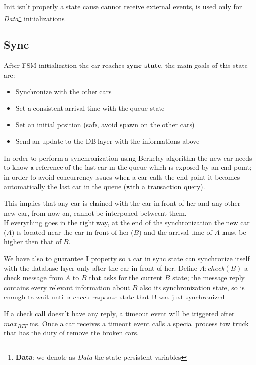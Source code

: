 Init isn't properly a state cause cannot receive external events, 
is used only for 
\textit{Data}\footnote{\textbf{Data}: we denote as \textit{Data} 
the state persistent variables} 
initializations.


\subsection{Sync}

After FSM initialization the car reaches \textbf{sync state}, the main goals 
of this state are:

\begin{itemize}
    \item Synchronize with the other cars
    \item Set a consistent arrival time with the queue state 
    \item Set an initial position (safe, avoid spawn on the other cars)
    \item Send an update to the DB layer with the informations above
\end{itemize}

In order to perform a synchronization using Berkeley algorithm the new car needs to 
know a reference of the last car in the queue which is exposed by an end point; 
in order to avoid concurrency issues when a car calls the end point 
it becomes automatically the last car in the queue (with a transaction query).

This implies that any car is chained with the car in front of her and any other 
new car, from now on, cannot be interponed betweent them.\\

\noindent
If everything goes in the right way, at the end of the synchronization the new car ($A$) 
is located near the car in front of her ($B$) and the arrival time of $A$ must be 
higher then that of $B$.

We have also to guarantee \textbf{I} property so a car in sync state can synchronize 
itself with the database layer only after the car in front of her. Define 
$A:check(B)$ a check message from $A$ to $B$ that asks for the current $B$ state;
the message reply contains every relevant information about $B$ also its synchronization 
state, so is enough to wait until a check response state that B was just 
synchronized.  

If a check call doesn't have any reply, a timeout event will be triggered after 
$max_{RTT}$ ms. Once a car receives a timeout event calls a special process 
tow truck that has the duty of remove the broken cars.  


